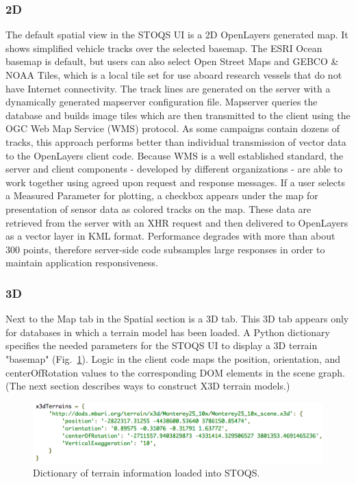 \documentclass[conference]{IEEEtran}
\begin{document}
\subsubsection{2D}
The default spatial view in the STOQS UI is a 2D OpenLayers generated map. It shows simplified vehicle tracks over the selected basemap. The ESRI Ocean basemap is default, but users can also select Open Street Maps and GEBCO \& NOAA Tiles, which is a local tile set for use aboard research vessels that do not have Internet connectivity. The track lines are generated on the server with a dynamically generated mapserver configuration file. Mapserver queries the database and builds image tiles which are then transmitted to the client using the OGC Web Map Service (WMS) protocol. As some campaigns contain dozens of tracks, this approach performs better than individual transmission of vector data to the OpenLayers client code. Because WMS is a well established standard, the server and client components - developed by different organizations - are able to work together using agreed upon request and response messages. If a user selects a Measured Parameter for plotting, a checkbox appears under the map for presentation of sensor data as colored tracks on the map. These data are retrieved from the server with an XHR request and then delivered to OpenLayers as a vector layer in KML format. Performance degrades with more than about 300 points, therefore server-side code subsamples large responses in order to maintain application responsiveness.

\subsubsection{3D}
Next to the Map tab in the Spatial section is a 3D tab. This 3D tab appears only for databases in which a terrain model has been loaded. A Python dictionary specifies the needed parameters for the STOQS UI to display a 3D terrain "basemap" (Fig.~\ref{fig:x3dTerrains}). Logic in the client code maps the position, orientation, and centerOfRotation values to the corresponding DOM elements in the scene graph. (The next section describes ways to construct X3D terrain models.)

\begin{figure}[htbp]
\centering
\includegraphics[width=1.0\linewidth]{x3dTerrains.png}
\caption{Dictionary of terrain information loaded into STOQS.}
\label{fig:x3dTerrains}
\end{figure}
\end{document}
